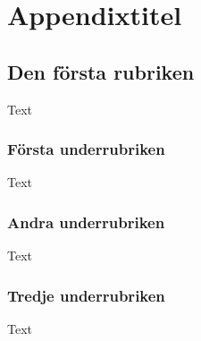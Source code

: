 \documentclass[10pt,oneside,swedish]{lips}
\begin{document}
\clearpage


\cleardoublepage
\appendix

\section{Appendixtitel}

\subsection{Den första rubriken}
Text

\subsubsection{Första underrubriken}
Text

\subsubsection{Andra underrubriken}
Text

\subsubsection{Tredje underrubriken}
Text
\end{document}
